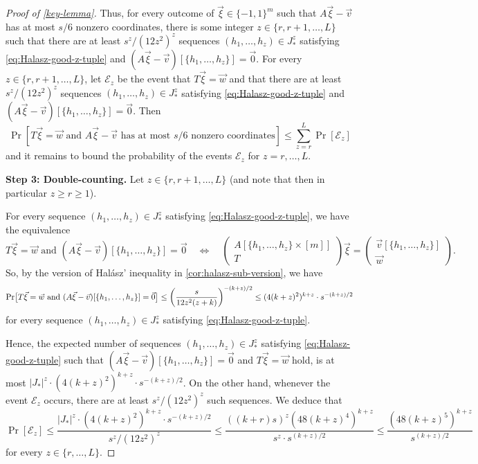 \documentclass[english]{article}
\theoremstyle{remark}
\numberwithin{equation}{section}
\numberwithin{figure}{section}
\let\originalleft\left
\let\originalright\right
\renewcommand{\left}{\mathopen{}\mathclose\bgroup\originalleft}
\renewcommand{\right}{\aftergroup\egroup\originalright}
\begin{document}
\begin{proof}[Proof of \cref{key-lemma}]
Thus, for every outcome of $\vec{\xi}\in \{-1,1\}^m$ such that $A\vec{\xi}-\vec{v}$ has at most $s/6$ nonzero coordinates,  there is some integer $z\in \{r,r+1,\dots,L\}$ such that there are at least $s^z/(12z^2)^z$ sequences $(h_1,\dots,h_z)\in J_*^z$ satisfying \cref{eq:Halasz-good-z-tuple} and $(A\vec{\xi}-\vec{v})[\{h_1,\dots,h_z\}]=\vec 0$. For every $z\in \{r,r+1,\dots,L\}$, let $\mathcal{E}_z$ be the event that $T\vec{\xi}=\vec{w}$ and that there are at least $s^z/(12z^2)^z$ sequences $(h_1,\dots,h_z)\in J_*^z$ satisfying \cref{eq:Halasz-good-z-tuple} and $(A\vec{\xi}-\vec{v})[\{h_1,\dots,h_z\}]=\vec 0$. Then
\begin{equation}\label{eq:sum-union-bound}
    \Pr[T\vec{\xi}=\vec{w}\text{ and }A\vec{\xi}-\vec{v}\text{ has at most }s/6\text{ nonzero coordinates}]\le \sum_{z=r}^{L} \Pr[\mathcal{E}_z]
\end{equation}
and it remains to bound the probability of the events $\mathcal{E}_z$ for $z=r,\dots,L$.

\textbf{Step 3: Double-counting. } Let $z\in \{r,r+1,\dots,L\}$ (and note that then in particular $z\ge r\ge 1$).

For every sequence $(h_1,\dots,h_z)\in J_*^z$ satisfying \cref{eq:Halasz-good-z-tuple}, we have the equivalence
\[T\vec{\xi}=\vec{w}\text{ and }(A\vec{\xi}-\vec{v})[\{h_1,\dots,h_z\}]=\vec 0
\quad \iff \quad 
\begin{pmatrix}A[\{h_{1},\dots,h_{z}\}\times[m]]\\
T
\end{pmatrix}
\vec{\xi}=
\begin{pmatrix}\vec{v}[\{h_{1},\dots,h_{z}\}]\\
\vec{w}
\end{pmatrix}.
\]
So, by the version of Hal\'asz' inequality in \cref{cor:halasz-sub-version}, we have
\[\Pr\bigl[T\vec{\xi}=\vec{w}\text{ and }(A\vec{\xi}-\vec{v})[\{h_1,\dots,h_z\}]=\vec 0\bigr]\le\left(\frac{s}{12z^{2}(z+k)} \right)^{-(k+z)/2}\le (4(k+z)^2)^{k+z}\cdot s^{-(k+z)/2}\label{eq:preserve-halasz-bound}
\]
for every sequence $(h_1,\dots,h_z)\in J_*^z$ satisfying \cref{eq:Halasz-good-z-tuple}.

Hence, the expected number of sequences $(h_1,\dots,h_z)\in J_*^z$ satisfying \cref{eq:Halasz-good-z-tuple} such that $(A\vec{\xi}-\vec{v})[\{h_1,\dots,h_z\}]=\vec 0$ and $T\vec{\xi}=\vec{w}$ hold, is at most $|J_*|^z\cdot (4(k+z)^2)^{k+z}\cdot s^{-(k+z)/2}$. On the other hand, whenever the event $\mathcal{E}_z$ occurs, there are at least $s^z/(12z^2)^z$ such sequences.
We deduce that
\[
    \Pr[\mathcal{E}_z]\le \frac{|J_*|^z\cdot (4(k+z)^2)^{k+z}\cdot s^{-(k+z)/2}}{s^z/(12z^2)^z}\le \frac{((k+r)s)^z (48(k+z)^4)^{k+z}}{s^z\cdot s^{(k+z)/2}}\le \frac{(48(k+z)^5)^{k+z}}{s^{(k+z)/2}}
\]
for every $z\in \{r,\dots,L\}$.


\end{proof}
\end{document}
